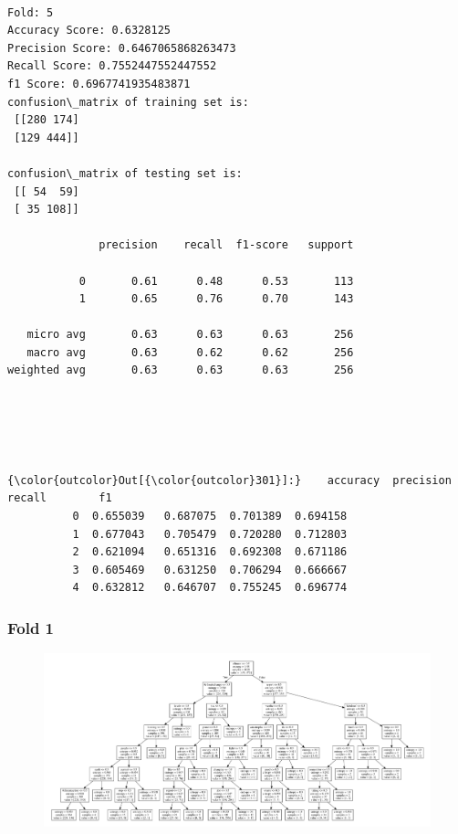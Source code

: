 \documentclass[11pt]{article}
\makeatletter
\def\maxwidth{\ifdim\Gin@nat@width>\linewidth\linewidth
    \else\Gin@nat@width\fi}
\let\Oldincludegraphics\includegraphics
\renewcommand{\includegraphics}[1]{\Oldincludegraphics[width=.8\maxwidth]{#1}}
\makeatother
\begin{document}
    \begin{Verbatim}[commandchars=\\\{\}]

Fold: 5
Accuracy Score: 0.6328125
Precision Score: 0.6467065868263473
Recall Score: 0.7552447552447552
f1 Score: 0.6967741935483871
confusion\_matrix of training set is: 
 [[280 174]
 [129 444]] 

confusion\_matrix of testing set is: 
 [[ 54  59]
 [ 35 108]] 

              precision    recall  f1-score   support

           0       0.61      0.48      0.53       113
           1       0.65      0.76      0.70       143

   micro avg       0.63      0.63      0.63       256
   macro avg       0.63      0.62      0.62       256
weighted avg       0.63      0.63      0.63       256


    \end{Verbatim}

    \begin{center}
    \end{center}
    { \hspace*{\fill} \\}
    
    \begin{center}
    \end{center}
    { \hspace*{\fill} \\}
    
\begin{Verbatim}[commandchars=\\\{\}]
{\color{outcolor}Out[{\color{outcolor}301}]:}    accuracy  precision    recall        f1
          0  0.655039   0.687075  0.701389  0.694158
          1  0.677043   0.705479  0.720280  0.712803
          2  0.621094   0.651316  0.692308  0.671186
          3  0.605469   0.631250  0.706294  0.666667
          4  0.632812   0.646707  0.755245  0.696774
\end{Verbatim}
            
    \subsubsection*{Fold 1}\label{fold-1}

\begin{figure}[H]
\centering
\includegraphics{1.png}
\caption{}
\end{figure}
\end{document}
